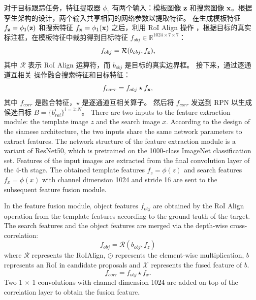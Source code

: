 对于目标跟踪任务，特征提取器 $\phi_{1}$ 有两个输入：模板图像 $\textbf z$ 和搜索图像 $\textbf x$。根据孪生架构的设计，两个输入共享相同的网络参数以提取特征。
在生成模板特征 $f_{\textbf z} = \phi_{1}(\textbf z)$ 和搜索特征 $f_{\textbf x} = \phi_{1}(\textbf x)$ 之后，利用 RoI Align 操作 \cite{He2018MaskR}，根据目标的真实标注框，在模板特征中裁剪得到目标特征 $f_{obj} \in \mathbb{R}^{1024 \times 7 \times 7}$：
\begin{equation}
    f_{obj} = \mathcal{R}(b_{obj}, f_{\textbf z}),
\end{equation}
其中 $\mathcal{R}$ 表示 RoI Align 运算符，而 $b_{obj}$ 是目标的真实边界框。
接下来，通过逐通道互相关 \cite{SiamRPN++} 操作融合搜索特征和目标特征：
\begin{equation}
    f_{corr} = f_{obj} \star f_{\textbf x},
\end{equation}
其中 $f_{corr}$ 是融合特征，$\star$ 是逐通道互相关算子。
然后将 $f_{corr}$ 发送到 RPN 以生成候选目标 $B=\{b^{i}_{roi}\}^{i=1:N}$。
\iffalse
There are two inputs to the feature extraction module: the template image $z$ and the search image $x$. According to the design of the siamese architecture, the two inputs share the same network parameters to extract features.
The network structure of the feature extraction module is a variant of ResNet50, which is pretrained on the 1000-class ImageNet classification set. Features of the input images are extracted from the final convolution layer of the 4-th stage. The obtained template features $f_{z} = \phi(z)$ and search features $f_{x} = \phi(x)$ with channel dimension 1024 and stride 16 are sent to the subsequent feature fusion module.

In the feature fusion module, object features $f_{obj}$ are obtained by the RoI Align operation from the template features according to the ground truth of the target. The search features and the object features are merged via the depth-wise cross-correlation:
\begin{equation}
    f_{obj} = \mathcal{R}(b_{obj}, f_{z})
\end{equation}
where $\mathcal{R}$ represents the RoIAlign, $\odot$ represents the element-wise multiplication, $b$ represents an RoI in candidate proposals and $\mathcal{X}$ represents the fused feature of $b$.
\begin{equation}
    f_{corr} = f_{obj} \star f_{x}.
\end{equation}
Two 1 $\times$ 1 convolutions with channel dimension 1024 are added on top of the correlation layer to obtain the fusion feature.

